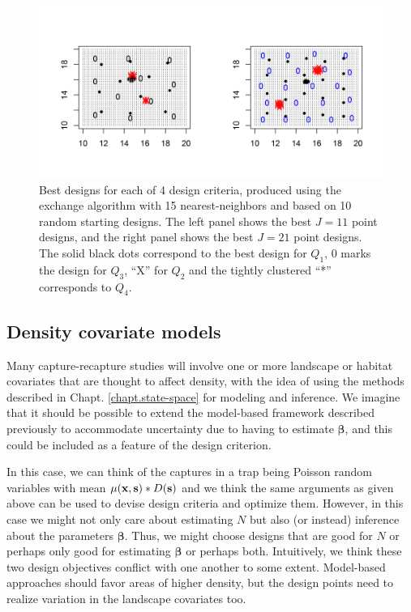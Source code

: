 \begin{figure}[ht]
\centering
\includegraphics[width=4.8in]{Ch10-Design/figs/designs.png}
\caption{Best designs for each of 4 design criteria, produced using
  the exchange algorithm with 15 nearest-neighbors and based on 10
  random starting designs. The left panel shows the best $J=11$ point
  designs, and the right panel shows the best $J=21$ point
  designs. The solid black dots correspond to the best design for
  $Q_{1}$, $0$ marks the design for $Q_{3}$, ``X'' for $Q_{2}$ and the
  tightly clustered ``*'' corresponds to $Q_{4}$. 
}
\label{design.fig.designs}
\end{figure}


\subsection{Density covariate models}

Many capture-recapture studies will involve one or more landscape or
habitat covariates that are thought to affect density, with the idea
of using the methods described in Chapt. \ref{chapt.state-space} for
modeling and inference.  We imagine that it should be possible to
extend the model-based framework described previously to accommodate
uncertainty due to having to estimate ${\bm \beta}$, and this could be
included as a feature of the design criterion.

In this case, we can think
of the captures in a trap being Poisson random variables with mean
$\mu({\bf x},{\bf s})*D({\bf s})$ 
and we think the same arguments
as given above can be used to devise design criteria and optimize
them. However, in this case we might not only care about estimating
$N$ but also (or instead) inference about the parameters ${\bm
  \beta}$. Thus, we might choose designs that are good for $N$ or
perhaps only good for estimating ${\bm \beta}$ or perhaps both.
Intuitively, we think these two design objectives conflict with one
another to some extent.  Model-based approaches should favor areas of
higher density, but the design points need to realize variation in the
landscape covariates too.



